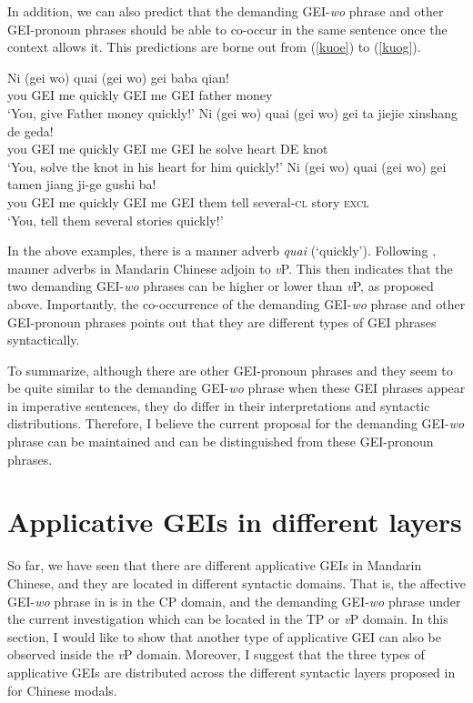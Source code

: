 \documentclass[output=paper,colorlinks,citecolor=brown]{langscibook}
\begin{document}
In addition, we can also predict that the demanding GEI-\textit{wo} phrase and other GEI-pronoun phrases should be able to co-occur in the same sentence once the context allows it. This predictions are borne out from (\ref{kuoe}) to (\ref{kuog}).

\ea
\label{kuoe}
\gll Ni     (gei wo)    quai    (gei wo)    gei baba    qian!\\  
     you     GEI me     quickly  GEI me     GEI father  money\\ 
\glt `You, give Father money quickly!'
\ex
\label{kuof}
\gll Ni     (gei wo)    quai    (gei wo)    gei ta  jiejie  xinshang    de  geda!\\  
     you     GEI me     quickly  GEI me     GEI he  solve   heart       DE  knot\\ 
\glt `You, solve the knot in his heart for him quickly!'
\ex
\label{kuog}
\gll Ni     (gei wo)    quai    (gei wo)    gei tamen   jiang   ji-ge       gushi   ba!\\  
     you     GEI me     quickly  GEI me     GEI them    tell    several-\textsc{cl}  story   \textsc{excl}\\ 
\glt `You, tell them several stories quickly!'
\z

In the above examples, there is a manner adverb \textit{quai} (`quickly'). Following \citet{Tsai2012}, manner adverbs in Mandarin Chinese adjoin to \textit{v}P. This then indicates that the two demanding GEI-\textit{wo} phrases can be higher or lower than \textit{v}P, as proposed above. Importantly, the co-occurrence of the demanding GEI-\textit{wo} phrase and other GEI-pronoun phrases points out that they are different types of GEI phrases syntactically.

To summarize, although there are other GEI-pronoun phrases and they seem to be quite similar to the demanding GEI-\textit{wo} phrase when these GEI phrases appear in imperative sentences, they do differ in their interpretations and syntactic distributions. Therefore, I believe the current proposal for the demanding GEI-\textit{wo} phrase can be maintained and can be distinguished from these GEI-pronoun phrases.

\section{Applicative GEIs in different layers}\label{sect5}

So far, we have seen that there are different applicative GEIs in Mandarin Chinese, and they are located in different syntactic domains. That is, the affective GEI-\textit{wo} phrase in \citet{Tsai2017} is in the CP domain, and the demanding GEI-\textit{wo} phrase under the current investigation which can be located in the TP or \textit{v}P domain. In this section, I would like to show that another type of applicative GEI can also be observed inside the \textit{v}P domain. Moreover, I suggest that the three types of applicative GEIs are distributed across the different syntactic layers proposed in \citet{Tsai2015a} for Chinese modals.
\end{document}
